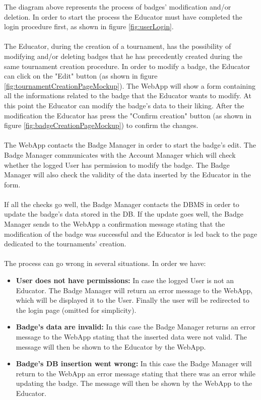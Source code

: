 \documentclass{article}
\begin{document}
{        The diagram above represents the process of badges' modification and/or deletion. 
        In order to start the process the Educator must have completed the login 
        procedure first, as shown in figure \ref{fig:userLogin}.
        \\ \\
        The Educator, during the creation of a tournament, has the possibility of modifying and/or
        deleting badges that he has precedently created during the same tournament creation procedure.
        In order to modify a badge, the Educator can click on the "Edit" button 
        (as shown in figure \ref{fig:tournamentCreationPageMockup}). The WebApp will show a form 
        containing all the informations related to the badge that the Educator wants to modify.
        At this point the Educator can modify the badge's data to their liking. After the modification the Educator has press the
        "Confirm creation" button (as shown in figure \ref{fig:badgeCreationPageMockup}) to confirm the changes.
        \\ \\
        The WebApp contacts the Badge Manager in order to start the badge's edit.
        The Badge Manager communicates with the Account Manager which will check whether the 
        logged User has permission to modify the badge. The Badge Manager will also
        check the validity of the data inserted by the Educator in the form.
        \\ \\
        If all the checks go well, the Badge Manager contacts the DBMS in order to update the
        badge's data stored in the DB.
        If the update goes well, the Badge Manager sends to the WebApp a confirmation
        message stating that the modification of the badge was successful and the Educator 
        is led back to the page dedicated to the tournaments' creation.
        \\ \\
        The process can go wrong in several situations. In order we have:
        \begin{itemize}
            \item \textbf{User does not have permissions:} In case the logged User is not an
            Educator. The Badge Manager will return an
            error message to the WebApp, which will be displayed it to the User.
            Finally the user will be redirected to the login page (omitted for simplicity).
            \item \textbf{Badge's data are invalid:} In this case the Badge Manager 
            returns an error message to the WebApp stating that the inserted data were not 
            valid. The message will then be shown to the Educator by the WebApp.
            \item \textbf{Badge's DB insertion went wrong:} In this case the Badge Manager will 
            return to the WebApp an error message stating that there was an error while updating 
            the badge. The message will then be shown by the WebApp to the Educator.
        \end{itemize}


}
\end{document}
